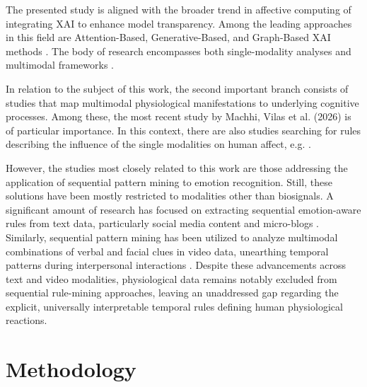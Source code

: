 \documentclass{isd}
\begin{document}
{The presented study is aligned with the broader trend in affective computing of integrating XAI to enhance model transparency. Among the leading approaches in this field are Attention-Based, Generative-Based, and Graph-Based XAI methods \cite{10130818}. The body of research encompasses both single-modality analyses \cite{ai7030095, 10766406} and multimodal frameworks \cite{11170860}.

In relation to the subject of this work, the second important branch consists of studies that map multimodal physiological manifestations to underlying cognitive processes. Among these, the most recent study by Machhi, Vilas et al. (2026) \cite{Machhi2026} is of particular importance. In this context, there are also studies searching for rules describing the influence of the single modalities on human affect, e.g. \cite{HRV2025}.

However, the studies most closely related to this work are those addressing the application of sequential pattern mining to emotion recognition. Still, these solutions have been mostly restricted to modalities other than biosignals. A significant amount of research has focused on extracting sequential emotion-aware rules from text data, particularly social media content and micro-blogs \cite{skenduli2021mining, wen2014emotion}. Similarly, sequential pattern mining has been utilized to analyze multimodal combinations of verbal and facial clues in video data, unearthing temporal patterns during interpersonal interactions \cite{porhet2017mining}. Despite these advancements across text and video modalities, physiological data remains notably excluded from sequential rule-mining approaches, leaving an unaddressed gap regarding the explicit, universally interpretable temporal rules defining human physiological reactions.

\section{Methodology}
\label{sec:methodology}

}
\end{document}
